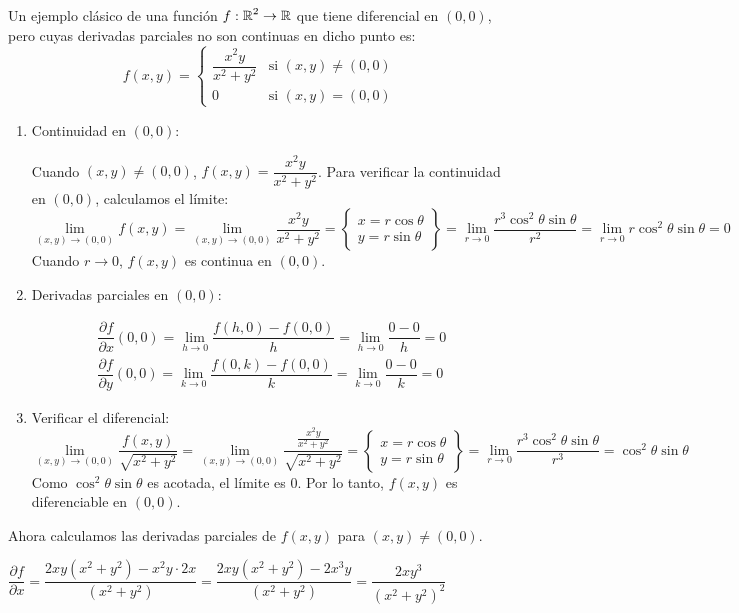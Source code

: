 \begin{enumerate}[label=\color{red}\textbf{\arabic*)}, leftmargin=*]
Un ejemplo clásico de una función $f:\operatorname{\mathbb{R}}^2\to\operatorname{\mathbb{R}}$ que tiene diferencial en $(0,0)$, pero cuyas derivadas parciales no son continuas en dicho punto es:
$$
f(x,y)=\begin{cases}
\dfrac{x^2y}{x^2+y^2} & \text{si }(x,y)\neq(0,0)\\
0 & \text{si }(x,y)=(0,0)
\end{cases}
$$
\begin{enumerate}[label=\arabic*)]
\item Continuidad en $(0,0)$:

Cuando $(x,y)\neq(0,0)$, $f(x,y)=\dfrac{x^2y}{x^2+y^2}$. Para verificar la continuidad en $(0,0)$, calculamos el límite:
$$
\lim_{(x,y)\to(0,0)}f(x,y)=\lim_{(x,y)\to(0,0)}\dfrac{x^2y}{x^2+y^2}=\left\{\begin{array}{l}
x=r\cos\theta\\
y=r\sin\theta
\end{array}\right\}=\lim_{r\to0}\dfrac{r^3\cos^2\theta\sin\theta}{r^2}=\lim_{r\to0}r\cos^2\theta\sin\theta=0
$$
Cuando $r\to0$, $f(x,y)$ es continua en $(0,0)$.

\item Derivadas parciales en $(0,0)$:

$$
\begin{array}{l}
\dfrac{ \partial f }{ \partial x } (0,0)=\lim_{ h \to 0 }\dfrac{f(h,0)-f(0,0)}{h}=\lim_{ h \to 0 }\dfrac{0-0}{h}=0 \\
\dfrac{ \partial f }{ \partial y }(0,0)=\lim_{ k \to 0 } \dfrac{f(0,k)-f(0,0)}{k}=\lim_{ k \to 0 }\dfrac{0-0}{k}=0
\end{array}
$$
\item Verificar el diferencial:
$$
\lim_{(x,y)\to(0,0)}\dfrac{f(x,y)}{\sqrt{ x^{2}+y^{2} }}=\lim_{(x,y)\to(0,0)}\dfrac{\frac{x^{2}y}{x^{2}+y^{2}}}{\sqrt{ x^{2}+y^{2} }}=\left\{ \begin{array}{l}
x=r\cos\theta \\
y=r\sin\theta
\end{array} \right\}=\lim_{ r \to 0 }\dfrac{r^{3}\cos ^{2}\theta \sin\theta}{r^{3}}=\cos ^{2}\theta \sin\theta
$$
Como $\cos ^{2}\theta \sin\theta$ es acotada, el límite es 0. Por lo tanto, $f(x,y)$ es diferenciable en $(0,0)$.

\end{enumerate}
Ahora calculamos las derivadas parciales de $f(x,y)$ para $(x,y)\neq(0,0)$.

$\dfrac{ \partial f }{ \partial x }=\dfrac{2xy(x^{2}+y^{2})-x^{2}y\cdot 2x}{(x^{2}+y^{2})}=\dfrac{2xy(x^{2}+y^{2})-2x^{3}y}{(x^{2}+y^{2})}=\dfrac{2xy^{3}}{(x^{2}+y^{2})^{2}}$ 


\end{enumerate}
